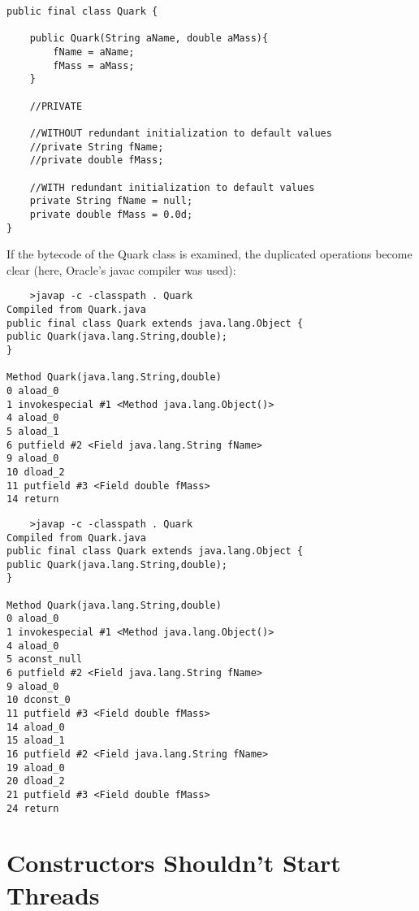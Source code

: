 \begin{verbatim}
public final class Quark {

    public Quark(String aName, double aMass){
        fName = aName;
        fMass = aMass;
    }

    //PRIVATE

    //WITHOUT redundant initialization to default values
    //private String fName;
    //private double fMass;

    //WITH redundant initialization to default values
    private String fName = null;
    private double fMass = 0.0d;
}
\end{verbatim}

If the bytecode of the Quark class is examined, the duplicated operations become clear (here, Oracle's javac compiler was used):


\begin{tcolorbox}[
skin=bicolor,colframe=blue!70!black,fonttitle=\bfseries,
    colback=blue!20!white,colbacklower=green!20!white,left=0ex,right=0ex,
    sidebyside,
  title={Title in the first language},
  after title={\hfill Title in the second language},
  width=\linewidth*1
  ]
    \begin{lstlisting}
    >javap -c -classpath . Quark
Compiled from Quark.java
public final class Quark extends java.lang.Object {
public Quark(java.lang.String,double);
}

Method Quark(java.lang.String,double)
0 aload_0
1 invokespecial #1 <Method java.lang.Object()>
4 aload_0
5 aload_1
6 putfield #2 <Field java.lang.String fName>
9 aload_0
10 dload_2
11 putfield #3 <Field double fMass>
14 return
    \end{lstlisting}
    \tcblower

    \begin{lstlisting}
    >javap -c -classpath . Quark
Compiled from Quark.java
public final class Quark extends java.lang.Object {
public Quark(java.lang.String,double);
}

Method Quark(java.lang.String,double)
0 aload_0
1 invokespecial #1 <Method java.lang.Object()>
4 aload_0
5 aconst_null
6 putfield #2 <Field java.lang.String fName>
9 aload_0
10 dconst_0
11 putfield #3 <Field double fMass>
14 aload_0
15 aload_1
16 putfield #2 <Field java.lang.String fName>
19 aload_0
20 dload_2
21 putfield #3 <Field double fMass>
24 return
    \end{lstlisting}
\end{tcolorbox}

\section{Constructors Shouldn't Start Threads}

